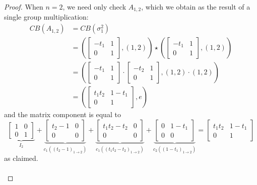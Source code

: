 \documentclass[10pt,a4paper]{amsart}
\begin{document}
\begin{proof}
	When $n=2$, we need only check $A_{1,2}$, which we obtain as the result of a single
	group multiplication:
	\begin{align*}
		CB(A_{1,2})&=CB(\sigma_1^2)\\
		&=
		\left(
		\begin{bmatrix}
			-t_1 & 1\\
			0 & 1
		\end{bmatrix},(1,2)
		\right)
		\star
		\left(
		\begin{bmatrix}
			-t_1 & 1\\
			0 & 1
		\end{bmatrix},(1,2)
		\right)\\
		&=
		\left(
		\begin{bmatrix}
			-t_1 & 1\\
			0 & 1
		\end{bmatrix}
		\cdot 
		\begin{bmatrix}
			-t_2 & 1\\
			0 & 1
		\end{bmatrix},(1,2)\cdot (1,2)
		\right)\\
		&=
		\left(
		\begin{bmatrix}
			t_1t_2 & 1-t_1\\
			0 & 1
		\end{bmatrix},e
		\right)
	\end{align*}
	and the matrix component is equal to
	$$
	\underbrace{\begin{bmatrix}
			1 & 0 \\
			0 & 1
	\end{bmatrix}}_{I_2}
	+
	\underbrace{\begin{bmatrix}
			t_2-1 & 0 \\
			0 & 0
	\end{bmatrix}}_{c_1((t_2-1)_{1\to 2})}
	+
	\underbrace{\begin{bmatrix}
			t_1t_2-t_2 & 0\\
			0 & 0
	\end{bmatrix}}_{c_1((t_1t_2-t_2)_{1\to 2})}
	+
	\underbrace{\begin{bmatrix}
			0 & 1-t_1\\
			0 & 0
	\end{bmatrix}}_{c_2((1-t_1)_{1\to 2})}
	=
	\begin{bmatrix}
		t_1t_2 & 1-t_1\\
		0 & 1
	\end{bmatrix}
	$$
	as claimed.
	\\
	\\

\end{proof}
\end{document}
